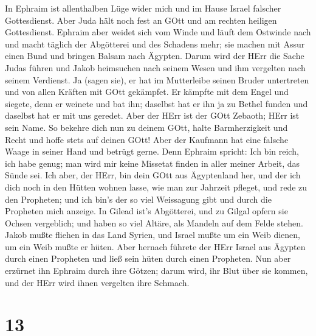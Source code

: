  In Ephraim ist allenthalben Lüge wider mich und im Hause
Israel falscher Gottesdienst. Aber Juda hält noch fest an GOtt und am
rechten heiligen Gottesdienst.  Ephraim aber weidet sich vom
Winde und läuft dem Ostwinde nach und macht täglich der Abgötterei und
des Schadens mehr; sie machen mit Assur einen Bund und bringen Balsam
nach Ägypten.  Darum wird der HErr die Sache Judas führen
und Jakob heimsuchen nach seinem Wesen und ihm vergelten nach seinem
Verdienst.  Ja (sagen sie), er hat im Mutterleibe seinen
Bruder untertreten und von allen Kräften mit GOtt gekämpfet.
 Er kämpfte mit dem Engel und siegete, denn er weinete und
bat ihn; daselbst hat er ihn ja zu Bethel funden und daselbst hat er mit
uns geredet.  Aber der HErr ist der GOtt Zebaoth; HErr ist
sein Name.  So bekehre dich nun zu deinem GOtt, halte
Barmherzigkeit und Recht und hoffe stets auf deinen GOtt! 
Aber der Kaufmann hat eine falsche Waage in seiner Hand und betrügt
gerne.  Denn Ephraim spricht: Ich bin reich, ich habe genug;
man wird mir keine Missetat finden in aller meiner Arbeit, das Sünde
sei.  Ich aber, der HErr, bin dein GOtt aus Ägyptenland
her, und der ich dich noch in den Hütten wohnen lasse, wie man zur
Jahrzeit pfleget,  und rede zu den Propheten; und ich bin's
der so viel Weissagung gibt und durch die Propheten mich anzeige.
 In Gilead ist's Abgötterei, und zu Gilgal opfern sie
Ochsen vergeblich; und haben so viel Altäre, als Mandeln auf dem Felde
stehen.  Jakob mußte fliehen in das Land Syrien, und Israel
mußte um ein Weib dienen, um ein Weib mußte er hüten.  Aber
hernach führete der HErr Israel aus Ägypten durch einen Propheten und
ließ sein hüten durch einen Propheten.  Nun aber erzürnet
ihn Ephraim durch ihre Götzen; darum wird, ihr Blut über sie kommen, und
der HErr wird ihnen vergelten ihre Schmach.

\hypertarget{section-12}{%
\section{13}\label{section-12}}

